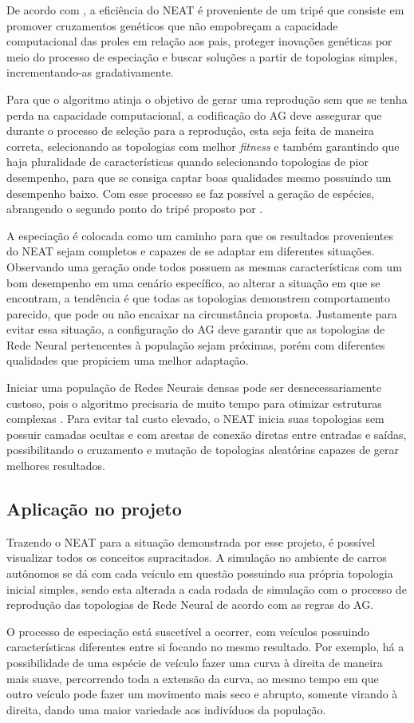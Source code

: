De acordo com , a eficiência do NEAT é proveniente de um 
tripé que consiste em promover cruzamentos genéticos que não empobreçam a 
capacidade computacional das proles em relação aos pais, proteger inovações 
genéticas por meio do processo de especiação e buscar soluções a partir de 
topologias simples, incrementando-as gradativamente. 

Para que o algoritmo atinja o objetivo de gerar uma reprodução sem que se 
tenha perda na capacidade computacional, a codificação do AG deve assegurar que 
durante o processo de seleção para a reprodução, esta seja feita de maneira correta, 
selecionando as topologias com melhor \textit{fitness} e também garantindo que haja 
pluralidade de características quando selecionando topologias de pior desempenho, 
para que se consiga captar boas qualidades mesmo possuindo um desempenho baixo. Com 
esse processo se faz possível a geração de espécies, abrangendo o 
segundo ponto do tripé proposto por .

A especiação é colocada como um caminho para que os resultados provenientes 
do NEAT sejam completos e capazes de se adaptar em diferentes situações. Observando 
uma geração onde todos possuem as mesmas características com um 
bom desempenho em uma cenário específico, ao alterar a situação em que se 
encontram, a tendência é que todas as topologias demonstrem comportamento 
parecido, que pode ou não encaixar na circunstância proposta. Justamente para evitar essa 
situação, a configuração do AG deve garantir que as topologias de Rede Neural 
pertencentes à população sejam próximas, porém com diferentes qualidades que 
propiciem uma melhor adaptação.

Iniciar uma população de Redes Neurais densas pode ser 
desnecessariamente custoso, pois o algoritmo precisaria de muito tempo para 
otimizar estruturas complexas \cite{stanley2002}. Para evitar tal 
custo elevado, o NEAT inicia suas topologias sem possuir camadas ocultas e com 
arestas de conexão diretas entre entradas e saídas, possibilitando o cruzamento e mutação de 
topologias aleatórias capazes de gerar melhores resultados.

\subsection{Aplica{\c c}{\~a}o no projeto}

Trazendo o NEAT para a situação demonstrada por esse projeto, é possível 
visualizar todos os conceitos supracitados. A simulação no ambiente de carros 
autônomos se dá com cada veículo em questão possuindo sua própria topologia 
inicial simples, sendo esta alterada a cada rodada de simulação com o processo 
de reprodução das topologias de Rede Neural de acordo com as regras do AG. 

O processo de especiação está suscetível a ocorrer, com veículos possuindo 
características diferentes entre si focando no mesmo resultado. Por exemplo, há a 
possibilidade de uma espécie de veículo fazer uma curva à direita de maneira mais 
suave, percorrendo toda a extensão da curva, ao mesmo tempo em que outro 
veículo pode fazer um movimento mais seco e abrupto, somente virando à direita, 
dando uma maior variedade aos indivíduos da população.
